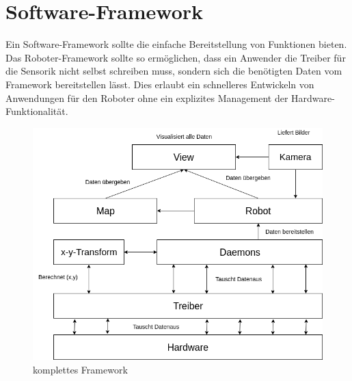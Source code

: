 \documentclass[twoside,12pt,a4paper]{report}
\begin{document}
	\FloatBarrier
	\section{Software-Framework}
	Ein Software-Framework sollte die einfache Bereitstellung von Funktionen bieten. Das Roboter-Framework sollte so ermöglichen, dass ein Anwender die Treiber für die Sensorik nicht selbst schreiben muss, sondern sich die benötigten Daten vom Framework bereitstellen lässt. Dies erlaubt ein schnelleres Entwickeln von Anwendungen für den Roboter ohne ein explizites Management der Hardware-Funktionalität. 
	
	\begin{figure}[!htb]
		\centering
		\includegraphics[scale=0.50]{images/Framework.png}
		\caption{komplettes Framework}
	\end{figure}
	
\end{document}

